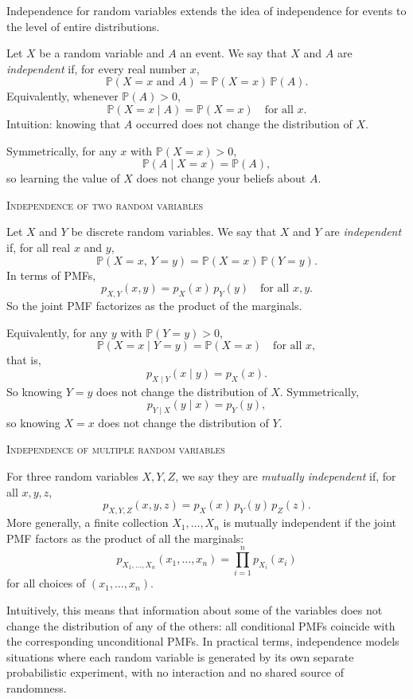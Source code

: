 Independence for random variables extends the idea of independence for events to the level of entire distributions.

Let \(X\) be a random variable and \(A\) an event.  
We say that \(X\) and \(A\) are \textit{independent} if, for every real number \(x\),
\[
\mathbb{P}(X = x \text{ and } A) = \mathbb{P}(X = x)\,\mathbb{P}(A).
\]
Equivalently, whenever \(\mathbb{P}(A) > 0\),
\[
\mathbb{P}(X = x \mid A) = \mathbb{P}(X = x) \quad \text{for all } x.
\]
Intuition: knowing that \(A\) occurred does not change the distribution of \(X\).  

Symmetrically, for any \(x\) with \(\mathbb{P}(X = x) > 0\),
\[
\mathbb{P}(A \mid X = x) = \mathbb{P}(A),
\]
so learning the value of \(X\) does not change your beliefs about \(A\).

\bigskip\textsc{Independence of two random variables}

Let \(X\) and \(Y\) be discrete random variables.  
We say that \(X\) and \(Y\) are \textit{independent} if, for all real \(x\) and \(y\),
\[
\mathbb{P}(X = x,\, Y = y)
= \mathbb{P}(X = x)\,\mathbb{P}(Y = y).
\]
In terms of PMFs,
\[
p_{X,Y}(x,y) = p_X(x)\,p_Y(y) \quad \text{for all } x,y.
\]
So the joint PMF factorizes as the product of the marginals.

Equivalently, for any \(y\) with \(\mathbb{P}(Y = y) > 0\),
\[
\mathbb{P}(X = x \mid Y = y) = \mathbb{P}(X = x) \quad \text{for all } x,
\]
that is,
\[
p_{X\mid Y}(x\mid y) = p_X(x).
\]
So knowing \(Y=y\) does not change the distribution of \(X\).  
Symmetrically,
\[
p_{Y\mid X}(y\mid x) = p_Y(y),
\]
so knowing \(X=x\) does not change the distribution of \(Y\).

\bigskip\textsc{Independence of multiple random variables}

For three random variables \(X,Y,Z\), we say they are \textit{mutually independent} if, for all \(x,y,z\),
\[
p_{X,Y,Z}(x,y,z)
= p_X(x)\,p_Y(y)\,p_Z(z).
\]
More generally, a finite collection \(X_1,\dots,X_n\) is mutually independent if the joint PMF factors as the product of all the marginals:
\[
p_{X_1,\dots,X_n}(x_1,\dots,x_n)
= \prod_{i=1}^{n} p_{X_i}(x_i)
\]
for all choices of \((x_1,\dots,x_n)\).

Intuitively, this means that information about some of the variables does not change the distribution of any of the others: all conditional PMFs coincide with the corresponding unconditional PMFs.  
In practical terms, independence models situations where each random variable is generated by its own separate probabilistic experiment, with no interaction and no shared source of randomness.



